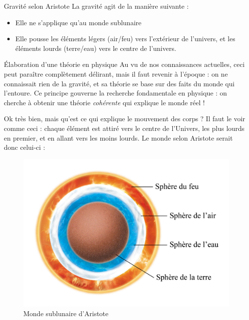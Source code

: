 \documentclass{classe}
\begin{document}
\begin{propositionfr}{Gravité selon Aristote}{}
La gravité agit de la manière suivante :
\begin{itemize}
	\item Elle ne s'applique qu'au monde sublunaire
	\item Elle pousse les éléments légers (air/feu) vers l'extérieur de l'univers, et les éléments lourds (terre/eau) vers le centre de l'univers.
\end{itemize}
\end{propositionfr}

\begin{remarque}{Élaboration d'une théorie en physique}{}
Au vu de nos connaissances actuelles, ceci peut paraître complètement délirant, mais il faut revenir à l'époque : on ne connaissait rien de la gravité, et sa théorie se base sur des faits du monde qui l'entoure. Ce principe gouverne la recherche fondamentale en physique : on cherche à obtenir une théorie \textit{cohérente} qui explique le monde réel !
\end{remarque}

Ok très bien, mais qu'est ce qui explique le mouvement des corps ? Il faut le voir comme ceci : chaque élément est attiré vers le centre de l'Univers, les plus lourds en premier, et en allant vers les moins lourds. Le monde selon Aristote serait donc celui-ci :

\begin{figure}[H]
\includegraphics[scale=.8]{Sublunaire.jpg}
\centering
\caption{Monde sublunaire d'Aristote}
\end{figure}
\end{document}
